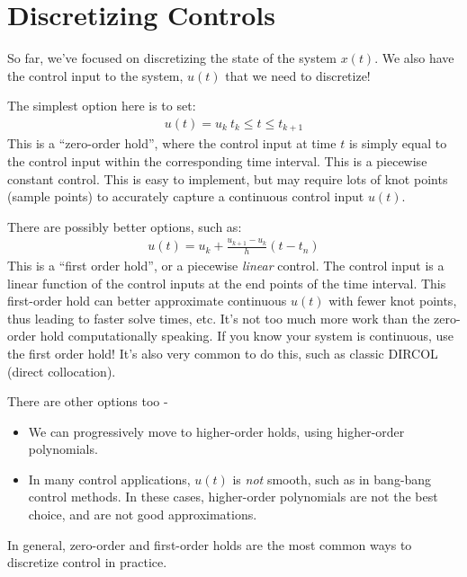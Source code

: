 \section{Discretizing Controls}
So far, we've focused on discretizing the state of the system $x(t)$. We also have the control input to the system, $u(t)$ that we need to discretize!

\noindent
The simplest option here is to set:
\begin{align}
    u(t) = u_k  \ t_{k} \leq t \leq t_{k+1}
\end{align}
This is a ``zero-order hold'', where the control input at time $t$ is simply equal to the control input within the corresponding time interval. This is a piecewise constant control.
This is easy to implement, but may require lots of knot points (sample points) to accurately capture a continuous control input $u(t)$.

\noindent
There are possibly better options, such as:
 \begin{align}
     u(t) = u_{k} + \frac{u_{k+1}-u_k}{h} (t-t_n)
 \end{align}
This is a ``first order hold'', or a piecewise \textit{linear} control. The control input is a linear function of the control inputs at the end points of the time interval.
This first-order hold can better approximate continuous $u(t)$ with fewer knot points, thus leading to faster solve times, etc. It's not too much more work than the zero-order hold computationally speaking. If you know your system is continuous, use the first order hold!
It's also very common to do this, such as classic DIRCOL (direct collocation).

\noindent
There are other options too -
\begin{itemize}
    \item We can progressively move to higher-order holds, using higher-order polynomials.
    \item In many control applications, $u(t)$ is \textit{not} smooth, such as in bang-bang control methods. In these cases, higher-order polynomials are not the best choice, and are not good approximations.
\end{itemize}

\noindent
In general, zero-order and first-order holds are the most common ways to discretize control in practice.


